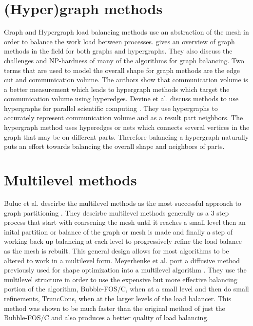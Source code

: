 \documentclass{thesis}
\begin{document}
\section{(Hyper)graph methods}
Graph and Hypergraph load balancing methods use an abstraction of the mesh in 
order to balance the work load between processes. \cite{surveygraph} gives an
overview of graph methods in the field for both graphs and hypergraphs. They 
also discuss the challenges and NP-hardness of many of the algorithms for graph
balancing. Two terms that are used to model the overall shape for graph methods
are the edge cut and communication volume. The authors show that communication
volume is a better measurement which leads to hypergraph methods which target 
the communication volume using hyperedges. Devine et al. discuss methods 
to use hypergraphs for parallel scientific computing \cite{hypergraph}. They
use hypergraphs to accurately represent communication volume and as a result
part neighbors. The hypergraph method uses hyperedges or nets which connects 
several vertices in the graph that may be on different parts. Therefore 
balancing a hypergraph naturally puts an effort towards balancing the overall
shape and neighbors of parts. 

\section{Multilevel methods}
Buluc et al. descirbe the multilevel methods as the most successful approach to 
graph partitioning \cite{surveygraph}. They descirbe multilevel methods generally 
as a 3 step process that start with coarsening the mesh until it reaches a small 
level then an inital partition or balance of the graph or mesh is made and finally
a step of working back up balancing at each level to progressively refine the 
load balance as the mesh is rebuilt. This general design allows for most 
algorithms to be altered to work in a multilevel form. Meyerhenke et al. 
port a diffusive method previously used for shape optimization into a 
multilevel algorithm \cite{multidiffuse}. They use the multilevel structure in 
order to use the expensive but more effective balancing portion of the 
algorithm, Bubble-FOS/C, when at a small level and then do small refinements, 
TruncCons, when at the larger levels of the load balancer. This method was 
shown to be much faster than the original method of just the Bubble-FOS/C and 
also produces a better quality of load balancing. 
\end{document}
